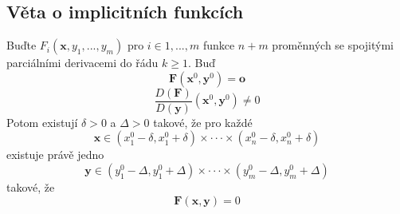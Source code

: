 \documentclass[../main.tex]{subfiles}
\begin{document}
\subsection{Věta o implicitních funkcích}
\hspace{1.2mm}
\noindent
Buďte $F_i(\mathbf{x}, y_1, ... , y_m)$ pro $i \in {1, ... , m}$ funkce $n+m$ proměnných se spojitými
parciálními derivacemi do řádu $k \geq 1$. Buď \[ \mathbf{F}(\mathbf{x}^0, \mathbf{y}^0) = \mathbf{o} \]
\[ \frac{D(\mathbf{F})}{D(\mathbf{y})}(\mathbf{x}^0, \mathbf{y}^0) \neq 0 \]
Potom existují $\delta > 0$ a $\Delta > 0$ takové, že pro každé
\[ \mathbf{x} \in (x_{1}^{0} - \delta, x_{1}^{0} + \delta) \times \cdot \cdot \cdot \times 
(x_{n}^{0} - \delta, x_{n}^{0} + \delta)\]
existuje právě jedno
\[ \mathbf{y} \in (y_{1}^{0} - \Delta , y_{1}^{0} + \Delta) \times \cdot \cdot \cdot \times
(y_{m}^{0} - \Delta , y_{m}^{0} + \Delta) \]
takové, že
\[ \mathbf{F}(\mathbf{x}, \mathbf{y}) = 0 \]

\end{document}
